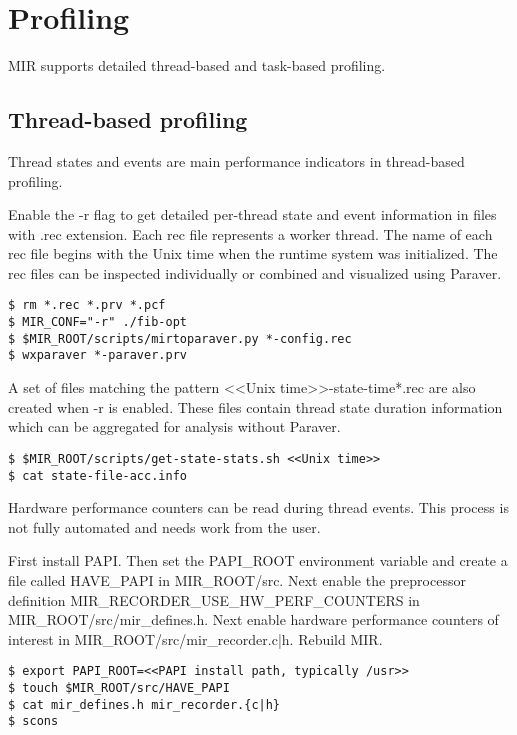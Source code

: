 \documentclass[11pt,a4paper,notitlepage]{article}
\begin{document}
\section{Profiling}
MIR supports detailed thread-based and task-based profiling.

\subsection{Thread-based profiling}
Thread states and events are main performance indicators in thread-based profiling. 

Enable the -r flag to get detailed per-thread state and event information in files with .rec extension.
Each rec file represents a worker thread.
The name of each rec file begins with the Unix time when the runtime system was initialized.
The rec files can be inspected individually or combined and visualized using Paraver.

\begin{lstlisting}[style=BashInputStyle]
$ rm *.rec *.prv *.pcf
$ MIR_CONF="-r" ./fib-opt
$ $MIR_ROOT/scripts/mirtoparaver.py *-config.rec 
$ wxparaver *-paraver.prv
\end{lstlisting}

A set of files matching the pattern <<Unix time>>-state-time*.rec are also created when -r is enabled. 
These files contain thread state duration information which can be aggregated for analysis without Paraver.

\begin{lstlisting}[style=BashInputStyle]
$ $MIR_ROOT/scripts/get-state-stats.sh <<Unix time>>
$ cat state-file-acc.info
\end{lstlisting}

Hardware performance counters can be read during thread events. This process is not fully automated and needs work from the user.

First install PAPI. 
Then set the PAPI\_ROOT environment variable and create a file called HAVE\_PAPI in MIR\_ROOT/src.
Next enable the preprocessor definition MIR\_RECORDER\_USE\_HW\_PERF\_COUNTERS in MIR\_ROOT/src/mir\_defines.h.
Next enable hardware performance counters of interest in MIR\_ROOT/src/mir\_recorder.{c|h}.
Rebuild MIR.

\begin{lstlisting}[style=BashInputStyle]
$ export PAPI_ROOT=<<PAPI install path, typically /usr>>
$ touch $MIR_ROOT/src/HAVE_PAPI
$ cat mir_defines.h mir_recorder.{c|h}
$ scons
\end{lstlisting}
\end{document}
